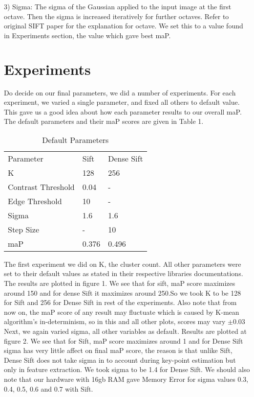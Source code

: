 \documentclass[conference,compsoc]{IEEEtran}
\begin{document}
3) Sigma: 	The sigma of the Gaussian applied to the input image at the first octave. Then the sigma is increased iteratively for further octaves. Refer to original SIFT paper for the explanation for octave. We set this to a value found in Experiments section, the value which gave best maP.\\

\section{Experiments}

Do decide on our final parameters, we did a number of experiments. For each experiment, we varied a single parameter, and fixed all others to default value. This gave us a good idea about how each parameter results to our overall maP.  The default parameters and their maP scores are given in Table 1. \\

\begin{table}[]
\centering

\label{my-label}
\begin{tabular}{lll}
Parameter          & Sift  & Dense Sift \\
K                  & 128   & 256        \\
Contrast Threshold & 0.04  & -          \\
Edge Threshold     & 10   & -          \\
Sigma              & 1.6  & 1.6        \\
Step Size          & -     & 10         \\
maP                & 0.376 & 0.496     
\end{tabular}
\caption{Default Parameters}
\end{table}

The first experiment we did on K, the cluster count. All other parameters were set to their default values as stated in their respective libraries documentations. The results are plotted in figure 1. We see that for sift, maP score maximizes around 150 and for dense Sift it maximizes around 250.So we took K to be 128 for Sift and 256 for Dense Sift in rest of the experiments. Also note that from now on, the maP score of any result may fluctuate which is caused by K-mean algorithm's in-determinism, so in this and all other plots, scores may vary $\pm 0.03$\\

Next, we again varied sigma, all other variables as default.  Results are plotted at figure 2. We see that for Sift, maP score maximizes around 1 and for Dense Sift sigma has very little affect on final maP score, the reason is that unlike Sift, Dense Sift does not take sigma in to account during key-point estimation but only in feature extraction. We  took sigma to be 1.4 for Dense Sift. We should also note that our hardware with 16gb RAM gave Memory Error for sigma values 0.3, 0.4, 0.5, 0.6 and 0.7 with Sift.\\
\end{document}
